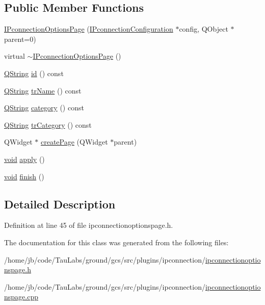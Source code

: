 \subsection*{\-Public \-Member \-Functions}
\begin{DoxyCompactItemize}
\item 
\hyperlink{group___i_p_conn_plugin_ga00a24fd6df6f9866d5b8e5eb76cd9c93}{\-I\-Pconnection\-Options\-Page} (\hyperlink{class_i_pconnection_configuration}{\-I\-Pconnection\-Configuration} $\ast$config, \-Q\-Object $\ast$parent=0)
\item 
virtual \hyperlink{group___i_p_conn_plugin_ga3b3b7d2dfd99db070bc9e3bebfaee3aa}{$\sim$\-I\-Pconnection\-Options\-Page} ()
\item 
\hyperlink{group___u_a_v_objects_plugin_gab9d252f49c333c94a72f97ce3105a32d}{\-Q\-String} \hyperlink{group___i_p_conn_plugin_ga4e312ba72e8ed237e148f6f2fd3bfd3f}{id} () const 
\item 
\hyperlink{group___u_a_v_objects_plugin_gab9d252f49c333c94a72f97ce3105a32d}{\-Q\-String} \hyperlink{group___i_p_conn_plugin_gaf5ef5d6b22e3098d76849cf94feeb35c}{tr\-Name} () const 
\item 
\hyperlink{group___u_a_v_objects_plugin_gab9d252f49c333c94a72f97ce3105a32d}{\-Q\-String} \hyperlink{group___i_p_conn_plugin_ga74c9ab9f46cce418606d0ee3fc3491a0}{category} () const 
\item 
\hyperlink{group___u_a_v_objects_plugin_gab9d252f49c333c94a72f97ce3105a32d}{\-Q\-String} \hyperlink{group___i_p_conn_plugin_gace8ed46c336f3ee28ed2afeae6088da2}{tr\-Category} () const 
\item 
\-Q\-Widget $\ast$ \hyperlink{group___i_p_conn_plugin_gabfa6c9961024b87e52e12a8e7145e4f6}{create\-Page} (\-Q\-Widget $\ast$parent)
\item 
\hyperlink{group___u_a_v_objects_plugin_ga444cf2ff3f0ecbe028adce838d373f5c}{void} \hyperlink{group___i_p_conn_plugin_gab7a01d955726b8a348fd5b7ee7ed1406}{apply} ()
\item 
\hyperlink{group___u_a_v_objects_plugin_ga444cf2ff3f0ecbe028adce838d373f5c}{void} \hyperlink{group___i_p_conn_plugin_gad905bf02420acad58a684461d456bd09}{finish} ()
\end{DoxyCompactItemize}


\subsection{\-Detailed \-Description}


\-Definition at line 45 of file ipconnectionoptionspage.\-h.



\-The documentation for this class was generated from the following files\-:\begin{DoxyCompactItemize}
\item 
/home/jb/code/\-Tau\-Labs/ground/gcs/src/plugins/ipconnection/\hyperlink{ipconnectionoptionspage_8h}{ipconnectionoptionspage.\-h}\item 
/home/jb/code/\-Tau\-Labs/ground/gcs/src/plugins/ipconnection/\hyperlink{ipconnectionoptionspage_8cpp}{ipconnectionoptionspage.\-cpp}\end{DoxyCompactItemize}
